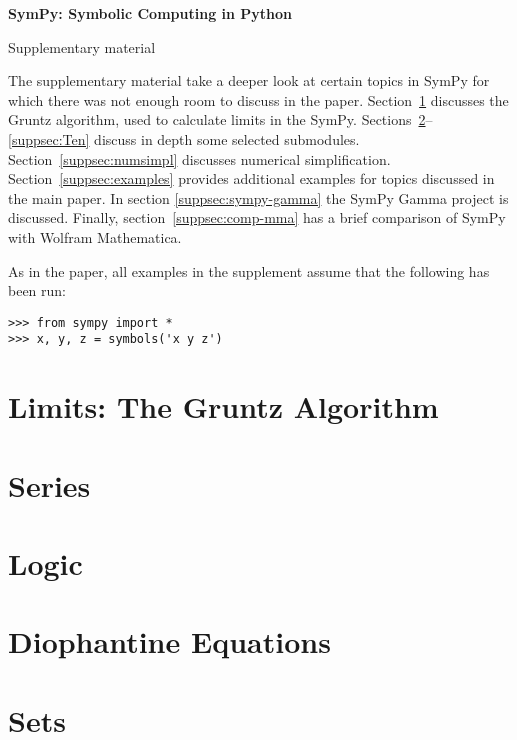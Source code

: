 \documentclass[fleqn,10pt,lineno,numbers]{wlpeerj} %
\begin{document}
\flushbottom
\thispagestyle{empty}%
\vskip-36pt%
{\raggedright\sffamily\bfseries\fontsize{20}{25}\selectfont SymPy: Symbolic Computing in Python\par}%
\vskip10pt
{\raggedright\sffamily\fontsize{12}{16}\selectfont  Supplementary material\par}
\vskip25pt%

The supplementary material take a deeper look at certain topics in SymPy for
which there was not enough room to discuss in the paper.
Section~\ref{suppsec:Gruntz} discusses the Gruntz algorithm, used to
calculate limits in the SymPy.  Sections~\ref{suppsec:Series}--\ref{suppsec:Ten}
discuss in depth some selected submodules.  Section~\ref{suppsec:numsimpl}
discusses numerical simplification.  Section~\ref{suppsec:examples} provides
additional examples for topics discussed in the main paper.  In section
\ref{suppsec:sympy-gamma} the SymPy Gamma
project is discussed.  Finally, section~\ref{suppsec:comp-mma}
has a
brief comparison of SymPy with Wolfram Mathematica.

As in the paper, all examples in the supplement assume that the following
has been run:
\begin{verbatim}
>>> from sympy import *
>>> x, y, z = symbols('x y z')
\end{verbatim}


\section{Limits: The Gruntz Algorithm}
\label{suppsec:Gruntz}


\section{Series}
\label{suppsec:Series}


\section{Logic}
\label{suppsec:Logic}


\section{Diophantine Equations}
\label{suppsec:Dioph}


\section{Sets}
\label{suppsec:Sets}

\end{document}
